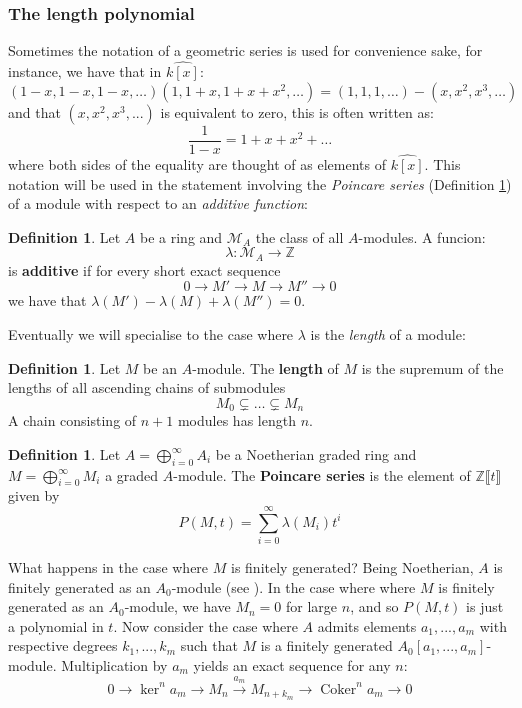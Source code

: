 \documentclass[12pt]{article}
\theoremstyle{plain}
\theoremstyle{definition}
\newtheorem{defn}[thm]{Definition} %
\newcommand{\bb}[1]{\mathbb{#1}}
\newcommand{\call}[1]{\mathcal{#1}}
\newcommand{\lto}{\longrightarrow}
\begin{document}
\subsubsection{The length polynomial}
Sometimes the notation of a geometric series is used for convenience sake, for instance, we have that in $\widehat{k[x]}$:
\[(1-x,1-x,1-x,\hdots)(1,1+x,1+x+x^2,\hdots) = (1,1,1,\hdots) - (x,x^2,x^3,\hdots)\]
and that $(x,x^2,x^3,...)$ is equivalent to zero, this is often written as:
\[\frac{1}{1-x} = 1 + x + x^2 + \hdots\]
where both sides of the equality are thought of as elements of $\widehat{k[x]}$. This notation will be used in the statement involving the \emph{Poincare series} (Definition \ref{def:poincare}) of a module with respect to an \emph{additive function}:
\begin{defn}
\label{def:length}
Let $A$ be a ring and $\call{M}_A$ the class of all $A$-modules. A funcion:
\[\lambda: \call{M}_A \lto \bb{Z}\]
is \textbf{additive} if for every short exact sequence
\[0 \lto M' \lto M \lto M'' \lto 0\]
we have that $\lambda(M') - \lambda(M) + \lambda(M'') = 0$.
\end{defn}
Eventually we will specialise to the case where $\lambda$ is the \emph{length} of a module:
\begin{defn}
Let $M$ be an $A$-module. The \textbf{length} of $M$ is the supremum of the lengths of all ascending chains of submodules
\[M_0 \subsetneq \hdots \subsetneq M_n\]
A chain consisting of $n+1$ modules has length $n$.
\end{defn}
\begin{defn}
\label{def:poincare} Let $A = \bigoplus_{i = 0}^\infty A_i$ be a Noetherian graded ring and $M = \bigoplus_{i = 0}^\infty M_i$ a graded $A$-module. The \textbf{Poincare series} is the element of $\bb{Z}\llbracket t \rrbracket$ given by
\[P(M,t) = \sum_{i = 0}^\infty \lambda(M_i)t^i\]
\end{defn}
What happens in the case where $M$ is finitely generated? Being Noetherian, $A$ is finitely generated as an $A_0$-module (see \cite{com_alg_notes}). In the case where where $M$ is finitely generated as an $A_0$-module, we have $M_n = 0$ for large $n$, and so $P(M,t)$ is just a polynomial in $t$. Now consider the case where $A$ admits elements $a_1,...,a_m$ with respective degrees $k_1,...,k_m$ such that $M$ is a finitely generated $A_0[a_1,...,a_m]$-module. Multiplication by $a_m$ yields an exact sequence for any $n$:
\begin{equation}
    \label{eq:mult_by_an}
    0 \lto \ker^n a_m \lto M_n \stackrel{a_m}{\lto} M_{n + k_m} \lto \operatorname{Coker}^n a_m \lto 0
\end{equation}
\end{document}
